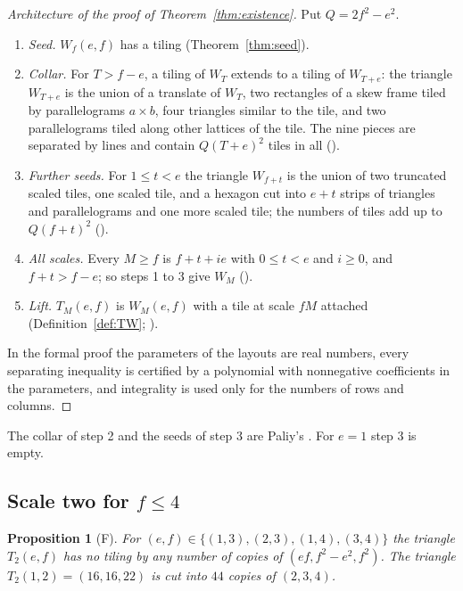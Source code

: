 \documentclass[11pt,reqno]{amsart}
\theoremstyle{plain}
\newtheorem{proposition}[theorem]{Proposition}
\theoremstyle{definition}
\newcommand{\sF}{\textup{\textsf{F}}}
\begin{document}
\begin{proof}[Architecture of the proof of Theorem~\ref{thm:existence}]
Put $Q=2f^2-e^2$.
\begin{enumerate}
\item[1.] \emph{Seed.} $W_f(e,f)$ has a tiling (Theorem~\ref{thm:seed}).
\item[2.] \emph{Collar.} For $T>f-e$, a tiling of $W_T$ extends to a tiling of $W_{T+e}$: the triangle
$W_{T+e}$ is the union of a translate of $W_T$, two rectangles of a skew frame tiled by parallelograms
$a\times b$, four triangles similar to the tile, and two parallelograms tiled along other lattices of the
tile. The nine pieces are separated by lines and contain $Q(T+e)^2$ tiles in all
().
\item[3.] \emph{Further seeds.} For $1\le t<e$ the triangle $W_{f+t}$ is the union of two truncated scaled
tiles, one scaled tile, and a hexagon cut into $e+t$ strips of triangles and parallelograms and one more
scaled tile; the numbers of tiles add up to $Q(f+t)^2$
().
\item[4.] \emph{All scales.} Every $M\ge f$ is $f+t+ie$ with $0\le t<e$ and $i\ge0$, and $f+t>f-e$; so
steps 1 to 3 give $W_M$ ().
\item[5.] \emph{Lift.} $T_M(e,f)$ is $W_M(e,f)$ with a tile at scale $fM$ attached
(Definition~\ref{def:TW}; ).
\end{enumerate}
In the formal proof the parameters of the layouts are real numbers, every separating inequality is
certified by a polynomial with nonnegative coefficients in the parameters, and integrality is used only for
the numbers of rows and columns.
\end{proof}

The collar of step 2 and the seeds of step 3 are Paliy's \cite{PaliyLedger}. For $e=1$ step 3 is empty.

\subsection{Scale two for $f\le4$}

\begin{proposition}[\sF]\label{prop:scale2}
For $(e,f)\in\{(1,3),(2,3),(1,4),(3,4)\}$ the triangle $T_2(e,f)$ has no tiling by any number of copies of
$(ef,f^2-e^2,f^2)$. The triangle $T_2(1,2)=(16,16,22)$ is cut into $44$ copies of $(2,3,4)$.
\end{proposition}
\end{document}
